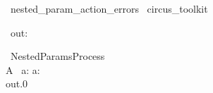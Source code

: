 
\begin{zsection}
  \SECTION\ nested\_param\_action\_errors \parents\ circus\_toolkit
\end{zsection}

\begin{circus}
    \circchannel\ out: \nat
\end{circus}

\begin{circus}
    \circprocess\ NestedParamsProcess ~~\circdef~~ \circbegin \\
    A \circdef\ a: \nat \circspot a: \seq~\nat \circspot\ \Skip \\
    \circspot out.0 \then \Skip \\
    \circend
\end{circus}
